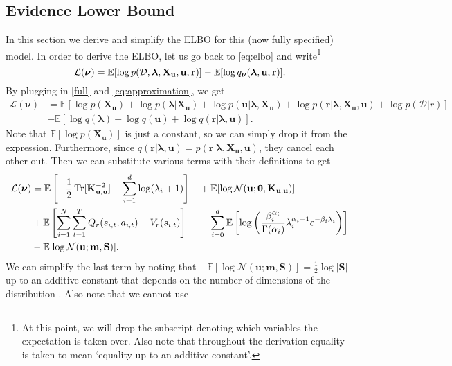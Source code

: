 \documentclass{mprop}
\theoremstyle{definition}
\DeclareMathOperator{\Tr}{Tr}
\begin{document}
\subsection{Evidence Lower Bound} \label{sec:elbo}

In this section we derive and simplify the ELBO for this (now fully specified)
model. In order to derive the ELBO, let us go back to \eqref{eq:elbo} and
write\footnote{At this point, we will drop the subscript denoting which
  variables the expectation is taken over. Also note that throughout the
  derivation equality is taken to mean `equality up to an additive constant'.}
\[ \mathcal{L}(\bm\nu) = \mathbb{E}[\log p(\mathcal{D}, \bm\lambda, \mathbf{X_u}, \mathbf{u}, \mathbf{r})] -
  \mathbb{E}[\log q_{\bm\nu}(\bm\lambda, \mathbf{u}, \mathbf{r})]. \]
By plugging in \eqref{full} and \eqref{eq:approximation}, we get
\[
  \begin{split}
    \mathcal{L}(\bm\nu) &= \mathbb{E}[\log p(\mathbf{X_u}) + \log p(\bm\lambda |
    \mathbf{X_u}) + \log p(\mathbf{u} | \bm\lambda, \mathbf{X_u}) + \log
    p(\mathbf{r} | \bm\lambda, \mathbf{X_u}, \mathbf{u}) + \log p(\mathcal{D} | r)] \\
    &- \mathbb{E}[\log q(\bm\lambda) + \log q(\mathbf{u}) + \log q(\mathbf{r} |
    \bm\lambda, \mathbf{u})].
  \end{split}
\]
Note that $\mathbb{E}[\log p(\mathbf{X_u})]$ is just a constant, so we can
simply drop it from the expression. Furthermore, since $q(\mathbf{r} | \bm\lambda,
\mathbf{u}) = p(\mathbf{r} | \bm\lambda, \mathbf{X_u}, \mathbf{u})$, they cancel
each other out. Then we can substitute various terms with their definitions to
get
\begin{alignat*}{3}
  \mathcal{L}(\bm\nu) &= \mathbb{E}\left[-\frac{1}{2}\Tr[\Kuu^{-2}] -
    \sum_{i=1}^d \log(\lambda_i + 1)\right] &&+ \mathbb{E}[\log
  \mathcal{N}(\mathbf{u}; \mathbf{0}, \Kuu)] \\
  &+ \mathbb{E}\left[ \sum_{i=1}^N \sum_{t=1}^T Q_r(s_{i,t}, a_{i,t}) -
    V_r(s_{i,t}) \right] &&-
  \sum_{i=0}^d\mathbb{E}\left[\log\left(\frac{\beta_i^{\alpha_i}}{\Gamma(\alpha_i)}\lambda_i^{\alpha_i
        - 1}e^{-\beta_i\lambda_i}\right)\right] \\
  &-
  \mathbb{E}[\log\mathcal{N}(\mathbf{u}; \mathbf{m}, \mathbf{S})].
\end{alignat*}
We can simplify the last term by noting that $-\mathbb{E}[\log
\mathcal{N}(\mathbf{u}; \mathbf{m}, \mathbf{S})] = \frac{1}{2}\log|\mathbf{S}|$
up to an additive constant that depends on the number of dimensions of the
distribution \cite{DBLP:journals/tit/AhmedG89}. Also note that we cannot use
\end{document}
